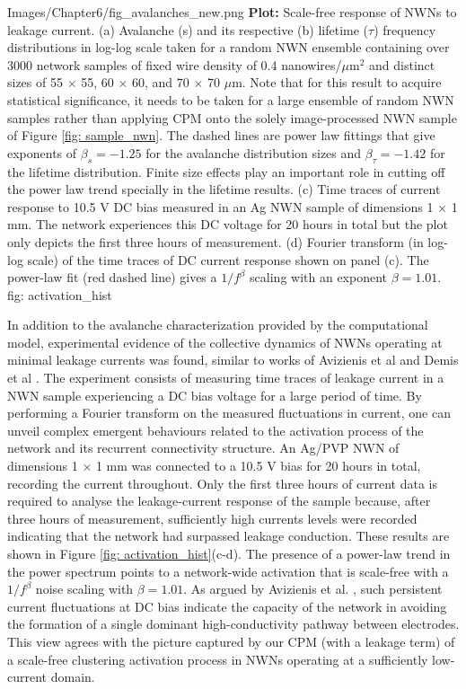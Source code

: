 {Images/Chapter6/fig_avalanches_new.png}
{\textbf{Plot:} Scale-free response of NWNs to leakage current.}
{(a) Avalanche (s) and its respective (b) lifetime ($\tau$) frequency distributions in log-log scale taken for a random NWN ensemble containing over 3000 network samples of fixed wire density of 0.4 nanowires/$\mu$m$^2$ and distinct sizes of 55 $\times$ 55, 60 $\times$ 60, and 70 $\times$ 70 $\mu$m. Note that for this result to acquire statistical significance, it needs to be taken for a large ensemble of random NWN samples rather than applying CPM onto the solely image-processed NWN sample of Figure \ref{fig: sample_nwn}. The dashed lines are power law fittings that give exponents of $\beta_s = -1.25$ for the avalanche distribution sizes and $\beta_\tau = -1.42$ for the lifetime distribution. Finite size effects play an important role in cutting off the power law trend specially in the lifetime results. (c) Time traces of current response to 10.5 V DC bias measured in an Ag NWN sample of dimensions 1 $\times$ 1 mm. The network experiences this DC voltage for 20 hours in total but the plot only depicts the first three hours of measurement. (d) Fourier transform (in log-log scale) of the time traces of DC current response shown on panel (c). The power-law fit (red dashed line) gives a $1/f^\beta$ scaling with an exponent $\beta = 1.01$\cite{ocallaco2018}.}
{fig: activation_hist}

In addition to the avalanche characterization provided by the computational model, experimental evidence of the collective dynamics of NWNs operating at minimal leakage currents was found, similar to works of Avizienis et al \cite{avizienis2012} and Demis et al \cite{demis2016}. The experiment consists of measuring time traces of leakage current in a NWN sample experiencing a DC bias voltage for a large period of time. By performing a Fourier transform on the measured fluctuations in current, one can unveil complex emergent behaviours related to the activation process of the network and its recurrent connectivity structure. An Ag/PVP NWN of dimensions 1 $\times$ 1 mm was connected to a 10.5 V bias for 20 hours in total, recording the current throughout. Only the first three hours of current data is required to analyse the leakage-current response of the sample because, after three hours of measurement, sufficiently high currents levels were recorded indicating that the network had surpassed leakage conduction. These results are shown in Figure \ref{fig: activation_hist}(c-d). The presence of a power-law trend in the power spectrum points to a network-wide activation that is scale-free with a $1/f^\beta$ noise scaling with $\beta = 1.01$. As argued by Avizienis et al. \cite{avizienis2012}, such persistent current fluctuations at DC bias indicate the capacity of the network in avoiding the formation of a single dominant high-conductivity pathway between electrodes. This view agrees with the picture captured by our CPM (with a leakage term) of a scale-free clustering activation process in NWNs operating at a sufficiently low-current domain.

